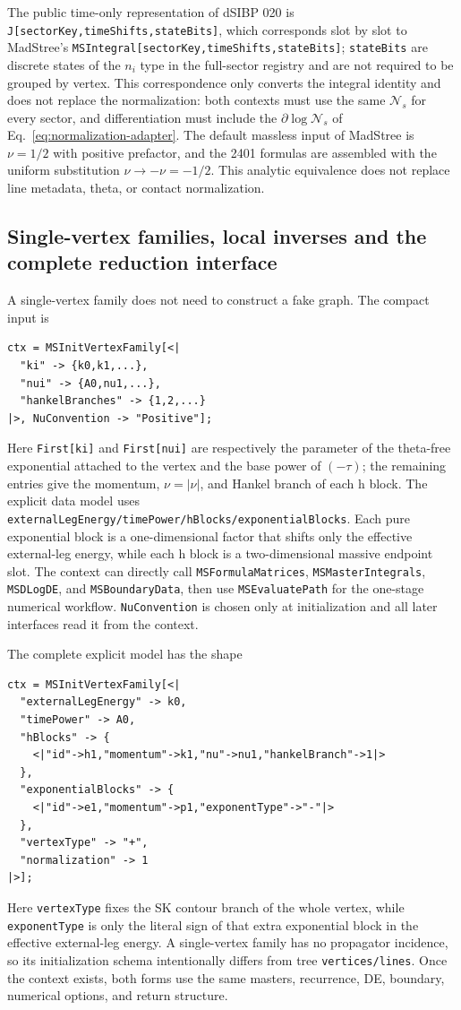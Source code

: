 \documentclass[11pt,a4paper]{article}
\newcommand{\cN}{\mathcal N}
\begin{document}
The public time-only representation of dSIBP 020 is \texttt{J[sectorKey,timeShifts,stateBits]}, which corresponds slot by slot to MadStree's \texttt{MSIntegral[sectorKey,timeShifts,stateBits]}; \texttt{stateBits} are discrete states of the $n_i$ type in the full-sector registry and are not required to be grouped by vertex. This correspondence only converts the integral identity and does not replace the normalization: both contexts must use the same $\cN_s$ for every sector, and differentiation must include the $\partial\log\cN_s$ of Eq.~\eqref{eq:normalization-adapter}. The default massless input of MadStree is $\nu=1/2$ with positive prefactor, and the 2401 formulas are assembled with the uniform substitution $\nu\to-\nu=-1/2$. This analytic equivalence does not replace line metadata, theta, or contact normalization.

\subsection{Single-vertex families, local inverses and the complete reduction interface}

A single-vertex family does not need to construct a fake graph. The compact input is
\begin{verbatim}
ctx = MSInitVertexFamily[<|
  "ki" -> {k0,k1,...},
  "nui" -> {A0,nu1,...},
  "hankelBranches" -> {1,2,...}
|>, NuConvention -> "Positive"];
\end{verbatim}
Here \texttt{First[ki]} and \texttt{First[nui]} are respectively the parameter of the
theta-free exponential attached to the vertex and the base power of $(-\tau)$; the remaining entries give the momentum,
$\nu=|\nu|$, and Hankel branch of each h block. The explicit data model uses
\texttt{externalLegEnergy/timePower/hBlocks/exponentialBlocks}. Each pure exponential block is a
one-dimensional factor that shifts only the effective external-leg energy, while each h block is a
two-dimensional massive endpoint slot. The context can directly call
\texttt{MSFormulaMatrices}, \texttt{MSMasterIntegrals}, \texttt{MSDLogDE}, and
\texttt{MSBoundaryData}, then use \texttt{MSEvaluatePath} for the one-stage numerical workflow.
\texttt{NuConvention} is chosen only at initialization and all later interfaces read it
from the context.

The complete explicit model has the shape
\begin{verbatim}
ctx = MSInitVertexFamily[<|
  "externalLegEnergy" -> k0,
  "timePower" -> A0,
  "hBlocks" -> {
    <|"id"->h1,"momentum"->k1,"nu"->nu1,"hankelBranch"->1|>
  },
  "exponentialBlocks" -> {
    <|"id"->e1,"momentum"->p1,"exponentType"->"-"|>
  },
  "vertexType" -> "+",
  "normalization" -> 1
|>];
\end{verbatim}
Here \texttt{vertexType} fixes the SK contour branch of the whole vertex, while
\texttt{exponentType} is only the literal sign of that extra exponential block in the effective
external-leg energy. A single-vertex family has no propagator incidence, so its initialization
schema intentionally differs from tree \texttt{vertices/lines}. Once the context exists, both
forms use the same masters, recurrence, DE, boundary, numerical options, and return structure.
\end{document}
